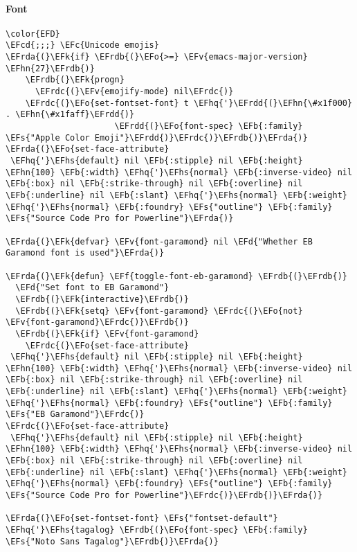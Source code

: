 \documentclass[a4wide,10pt]{article}
\newcommand{\EFc}[1]{\textcolor{EFc}{#1}} %
\newcommand{\EFcd}[1]{\textcolor{EFcd}{#1}} %
\newcommand{\EFs}[1]{\textcolor{EFs}{#1}} %
\newcommand{\EFd}[1]{\textcolor{EFd}{#1}} %
\newcommand{\EFk}[1]{\textcolor{EFk}{#1}} %
\newcommand{\EFb}[1]{\textcolor{EFb}{#1}} %
\newcommand{\EFf}[1]{\textcolor{EFf}{#1}} %
\newcommand{\EFv}[1]{\textcolor{EFv}{#1}} %
\newcommand{\EFo}[1]{\textcolor{EFo}{#1}} %
\newcommand{\EFhn}[1]{\textcolor{EFhn}{\textbf{#1}}} %
\newcommand{\EFhq}[1]{\textcolor{EFhq}{#1}} %
\newcommand{\EFhs}[1]{\textcolor{EFhs}{#1}} %
\newcommand{\EFrda}[1]{\textcolor{EFrda}{#1}} %
\newcommand{\EFrdb}[1]{\textcolor{EFrdb}{#1}} %
\newcommand{\EFrdc}[1]{\textcolor{EFrdc}{#1}} %
\newcommand{\EFrdd}[1]{\textcolor{EFrdd}{#1}} %
\begin{document}
\paragraph{Font}
\label{sec:org53eeb68}
\begin{Code}
\begin{Verbatim}
\color{EFD}
\EFcd{;;;} \EFc{Unicode emojis}
\EFrda{(}\EFk{if} \EFrdb{(}\EFo{>=} \EFv{emacs-major-version} \EFhn{27}\EFrdb{)}
    \EFrdb{(}\EFk{progn}
      \EFrdc{(}\EFv{emojify-mode} nil\EFrdc{)}
    \EFrdc{(}\EFo{set-fontset-font} t \EFhq{'}\EFrdd{(}\EFhn{\#x1f000} . \EFhn{\#x1faff}\EFrdd{)}
                      \EFrdd{(}\EFo{font-spec} \EFb{:family} \EFs{"Apple Color Emoji"}\EFrdd{)}\EFrdc{)}\EFrdb{)}\EFrda{)}
\EFrda{(}\EFo{set-face-attribute}
 \EFhq{'}\EFhs{default} nil \EFb{:stipple} nil \EFb{:height} \EFhn{100} \EFb{:width} \EFhq{'}\EFhs{normal} \EFb{:inverse-video} nil \EFb{:box} nil \EFb{:strike-through} nil \EFb{:overline} nil \EFb{:underline} nil \EFb{:slant} \EFhq{'}\EFhs{normal} \EFb{:weight} \EFhq{'}\EFhs{normal} \EFb{:foundry} \EFs{"outline"} \EFb{:family} \EFs{"Source Code Pro for Powerline"}\EFrda{)}

\EFrda{(}\EFk{defvar} \EFv{font-garamond} nil \EFd{"Whether EB Garamond font is used"}\EFrda{)}

\EFrda{(}\EFk{defun} \EFf{toggle-font-eb-garamond} \EFrdb{(}\EFrdb{)}
  \EFd{"Set font to EB Garamond"}
  \EFrdb{(}\EFk{interactive}\EFrdb{)}
  \EFrdb{(}\EFk{setq} \EFv{font-garamond} \EFrdc{(}\EFo{not} \EFv{font-garamond}\EFrdc{)}\EFrdb{)}
  \EFrdb{(}\EFk{if} \EFv{font-garamond}
    \EFrdc{(}\EFo{set-face-attribute}
 \EFhq{'}\EFhs{default} nil \EFb{:stipple} nil \EFb{:height} \EFhn{100} \EFb{:width} \EFhq{'}\EFhs{normal} \EFb{:inverse-video} nil \EFb{:box} nil \EFb{:strike-through} nil \EFb{:overline} nil \EFb{:underline} nil \EFb{:slant} \EFhq{'}\EFhs{normal} \EFb{:weight} \EFhq{'}\EFhs{normal} \EFb{:foundry} \EFs{"outline"} \EFb{:family} \EFs{"EB Garamond"}\EFrdc{)}
\EFrdc{(}\EFo{set-face-attribute}
 \EFhq{'}\EFhs{default} nil \EFb{:stipple} nil \EFb{:height} \EFhn{100} \EFb{:width} \EFhq{'}\EFhs{normal} \EFb{:inverse-video} nil \EFb{:box} nil \EFb{:strike-through} nil \EFb{:overline} nil \EFb{:underline} nil \EFb{:slant} \EFhq{'}\EFhs{normal} \EFb{:weight} \EFhq{'}\EFhs{normal} \EFb{:foundry} \EFs{"outline"} \EFb{:family} \EFs{"Source Code Pro for Powerline"}\EFrdc{)}\EFrdb{)}\EFrda{)}

\EFrda{(}\EFo{set-fontset-font} \EFs{"fontset-default"} \EFhq{'}\EFhs{tagalog} \EFrdb{(}\EFo{font-spec} \EFb{:family} \EFs{"Noto Sans Tagalog"}\EFrdb{)}\EFrda{)}



\end{Verbatim}
\end{Code}
\end{document}
